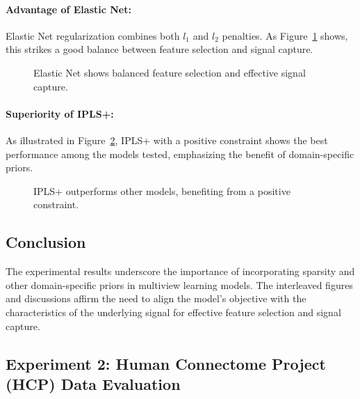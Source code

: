 \paragraph{Advantage of Elastic Net:}
Elastic Net regularization combines both $l_1$ and $l_2$ penalties. As Figure~\ref{fig:ElasticNet_weights} shows, this strikes a good balance between feature selection and signal capture.

\begin{figure}[h]
    \centering
    
    \caption{Elastic Net shows balanced feature selection and effective signal capture.}
    \label{fig:ElasticNet_weights}
\end{figure}

\paragraph{Superiority of IPLS+:}
As illustrated in Figure~\ref{fig:IPLS+_weights}, IPLS+ with a positive constraint shows the best performance among the models tested, emphasizing the benefit of domain-specific priors.

\begin{figure}[h]
    \centering
    
    \caption{IPLS+ outperforms other models, benefiting from a positive constraint.}
    \label{fig:IPLS+_weights}
\end{figure}

\subsection{Conclusion}

The experimental results underscore the importance of incorporating sparsity and other domain-specific priors in multiview learning models.
The interleaved figures and discussions affirm the need to align the model's objective with the characteristics of the underlying signal for effective feature selection and signal capture.




\subsection{Experiment 2: Human Connectome Project (HCP) Data Evaluation}

